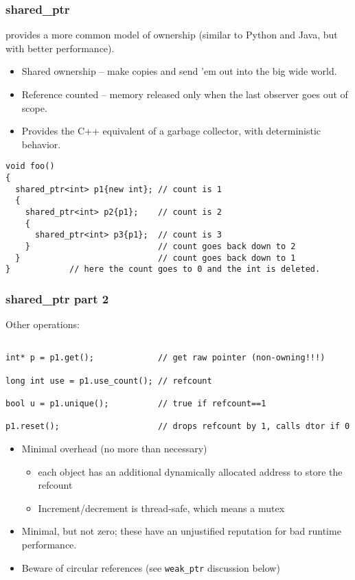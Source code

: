 \begin{frame}[fragile]
\frametitle{shared\_ptr}
 provides a more common model of ownership
(similar to Python and Java, but with better performance).

\begin{itemize}
\item Shared ownership -- make copies and send 'em out into the big wide
world.

\item Reference counted -- memory released only when the last observer
goes out of scope.

\item Provides the C++ equivalent of a garbage collector, with
  deterministic behavior.

\end{itemize}

{\scriptsize\begin{verbatim}
void foo() 
{  
  shared_ptr<int> p1{new int}; // count is 1
  {
    shared_ptr<int> p2{p1};    // count is 2
    {
      shared_ptr<int> p3{p1};  // count is 3
    }                          // count goes back down to 2
  }                            // count goes back down to 1
}            // here the count goes to 0 and the int is deleted.
\end{verbatim}}

\end{frame}



\begin{frame}[fragile]
\frametitle{shared\_ptr part 2}

Other operations:
{\scriptsize\begin{verbatim}

int* p = p1.get();             // get raw pointer (non-owning!!!)

long int use = p1.use_count(); // refcount

bool u = p1.unique();          // true if refcount==1

p1.reset();                    // drops refcount by 1, calls dtor if 0
\end{verbatim}
}



\begin{itemize}
\pause{}
\item Minimal overhead (no more than necessary)
\begin{itemize}
  \item each object has an additional dynamically allocated address to
    store the refcount
  \item Increment/decrement is thread-safe, which means a mutex
\end{itemize}
\vskip 6pt
\pause{}
\item Minimal, but not zero; these have an unjustified  
  reputation for bad runtime performance.
\vskip 6pt
\pause{}
\item Beware of circular references (see \texttt{weak\_ptr} discussion below)
\end{itemize}
\end{frame}

